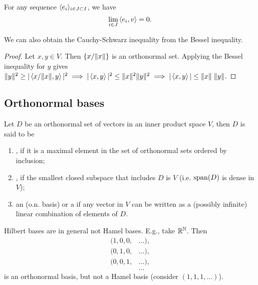 \begin{corollary}
For any sequence $\langle e_i \rangle_{i\in J \subset I}$, we have
\[ \lim_{i\in J} \left\langle e_i,v \right\rangle = 0. \]
\end{corollary}

\begin{corollary}
We can also obtain the Cauchy-Schwarz inequality from the Bessel inequality.
\end{corollary}
\begin{proof}
Let $x,y\in V$. Then $\{x/\lVert x\rVert\}$ is an orthonormal set. Applying the Bessel inequality for $y$ gives $\lVert y\rVert^2 \geq |\left\langle x/\lVert x\rVert, y \right\rangle|^2 \implies |\left\langle x,y \right\rangle|^2\leq \lVert x\rVert^2\lVert y\rVert^2 \implies |\left\langle x,y \right\rangle| \leq \lVert x\rVert\;\lVert y\rVert$.
\end{proof}

\subsection{Orthonormal bases}
\begin{definition}
Let $D$ be an orthonormal set of vectors in an inner product space $V$, then $D$ is said to be
\begin{enumerate}
\item {}, if it is a maximal element in the set of orthonormal sets ordered by inclusion;
\item {}, if the smallest closed subspace that includes $D$ is $V$ (i.e. $\operatorname{span}(D)$ is dense in $V$);
\item an  (o.n. basis) or a  if any vector in $V$ can be written as a (possibly infinite) linear combination of elements of $D$.
\end{enumerate}
\end{definition}
\begin{note}
Hilbert bases are in general not Hamel bases.  E.g., take $\mathbb{R}^\mathbb{N}$. Then 
\begin{align*}
(1,0,0,&\ldots), \\
(0,1,0,&\ldots), \\
(0,0,1,&\ldots), \\
&\ldots
\end{align*}
is an orthonormal basis, but not a Hamel basis (consider $(1,1,1,\ldots)$).
\end{note}

